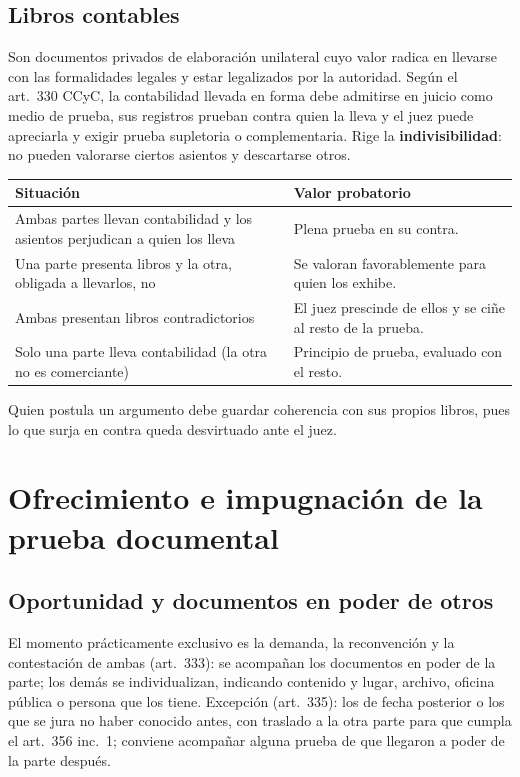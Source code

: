 \documentclass[12pt,oneside]{book}
\renewcommand{\arraystretch}{1.15}
\begin{document}
\subsection{Libros contables}

Son documentos privados de elaboración unilateral cuyo valor radica en llevarse con las formalidades legales y estar legalizados por la autoridad. Según el art.~330 CCyC, la contabilidad llevada en forma debe admitirse en juicio como medio de prueba, sus registros prueban contra quien la lleva y el juez puede apreciarla y exigir prueba supletoria o complementaria. Rige la \textbf{indivisibilidad}: no pueden valorarse ciertos asientos y descartarse otros.

\begin{table}[H]
\centering
\renewcommand{\arraystretch}{1.25}
\begin{tabularx}{\textwidth}{>{\RaggedRight\arraybackslash}p{}>{\RaggedRight\arraybackslash}X}
\toprule
\textbf{Situación} & \textbf{Valor probatorio} \\
\midrule
Ambas partes llevan contabilidad y los asientos perjudican a quien los lleva & Plena prueba en su contra. \\
Una parte presenta libros y la otra, obligada a llevarlos, no & Se valoran favorablemente para quien los exhibe. \\
Ambas presentan libros contradictorios & El juez prescinde de ellos y se ciñe al resto de la prueba. \\
Solo una parte lleva contabilidad (la otra no es comerciante) & Principio de prueba, evaluado con el resto. \\
\bottomrule
\end{tabularx}
\end{table}

Quien postula un argumento debe guardar coherencia con sus propios libros, pues lo que surja en contra queda desvirtuado ante el juez.

\section{Ofrecimiento e impugnación de la prueba documental}

\subsection{Oportunidad y documentos en poder de otros}

El momento prácticamente exclusivo es la demanda, la reconvención y la contestación de ambas (art.~333): se acompañan los documentos en poder de la parte; los demás se individualizan, indicando contenido y lugar, archivo, oficina pública o persona que los tiene. Excepción (art.~335): los de fecha posterior o los que se jura no haber conocido antes, con traslado a la otra parte para que cumpla el art.~356 inc.~1; conviene acompañar alguna prueba de que llegaron a poder de la parte después.
\end{document}
